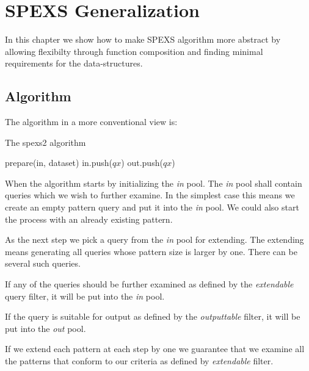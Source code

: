 \chapter{SPEXS Generalization}
\label{c:generalization}

In this chapter we show how to make SPEXS algorithm more abstract by allowing flexibilty through function composition and finding minimal requirements for the data-structures.

\section{Algorithm}

The algorithm in a more conventional view is:

\begin{algorithm}[H]
	\caption{The spexs2 algorithm}
\begin{algorithmic}[1]
	\Statex
		\State prepare(in, dataset)
					\State in.push($qx$)
						\State out.push($qx$)
					\EndIf
				\EndIf
			\EndFor
		\EndWhile
	\EndFunction
\end{algorithmic}
\end{algorithm}

When the algorithm starts by initializing the \emph{in} pool. The \emph{in} pool shall contain queries which we wish to further examine. In the simplest case this means we create an empty pattern query and put it into the \emph{in} pool. We could also start the process with an already existing pattern.

As the next step we pick a query from the \emph{in} pool for extending. The extending means generating all queries whose pattern size is larger by one. There can be several such queries.

If any of the queries should be further examined as defined by the \emph{extendable} query filter, it will be put into the \emph{in} pool.

If the query is suitable for output as defined by the \emph{outputtable} filter, it will be put into the \emph{out} pool. 

If we extend each pattern at each step by one we guarantee that we examine all the patterns that conform to our criteria as defined by \emph{extendable} filter.

